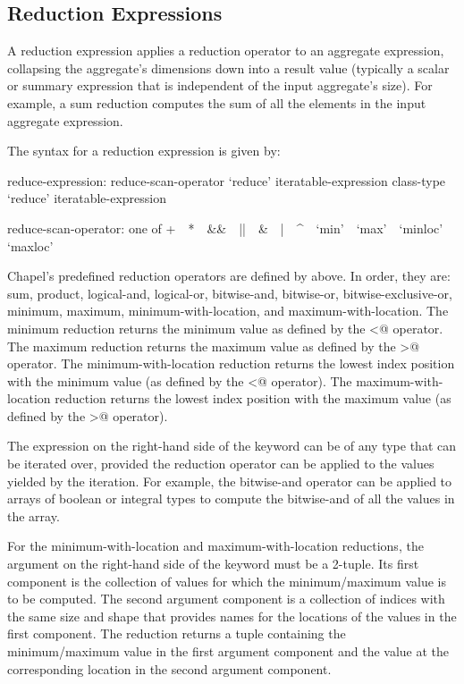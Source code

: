 \subsection{Reduction Expressions}
\label{reduce}

A reduction expression applies a reduction operator to an aggregate
expression, collapsing the aggregate's dimensions down into a result
value (typically a scalar or summary expression that is independent of
the input aggregate's size).  For example, a sum reduction computes
the sum of all the elements in the input aggregate expression.

The syntax for a reduction expression is given by:
\begin{syntax}
reduce-expression:
  reduce-scan-operator `reduce' iteratable-expression
  class-type `reduce' iteratable-expression

reduce-scan-operator: one of
  + $ $ $ $ * $ $ $ $ && $ $ $ $ || $ $ $ $ & $ $ $ $ | $ $ $ $ ^ $ $ $ $ `min' $ $ $ $ `max' $ $ $ $ `minloc' $ $ $ $ `maxloc'
\end{syntax}

Chapel's predefined reduction operators are defined
by  above.  In order, they are: sum,
product, logical-and, logical-or, bitwise-and, bitwise-or,
bitwise-exclusive-or, minimum, maximum, minimum-with-location, and
maximum-with-location.  The minimum reduction returns the minimum
value as defined by the \verb@<@ operator.  The maximum reduction
returns the maximum value as defined by the \verb@>@ operator.  The
minimum-with-location reduction returns the lowest index position with
the minimum value (as defined by the \verb@<@ operator).  The
maximum-with-location reduction returns the lowest index position with
the maximum value (as defined by the \verb@>@ operator).

The expression on the right-hand side of the  keyword
can be of any type that can be iterated over, provided
the reduction operator can be applied to the values yielded
by the iteration. For example, the bitwise-and
operator can be applied to arrays of boolean or integral types to
compute the bitwise-and of all the values in the array.

For the minimum-with-location and maximum-with-location reductions,
the argument on the right-hand side of the  keyword
must be a 2-tuple. Its first component is the collection
of values for which the minimum/maximum value is to be computed.  The
second argument component is a collection of indices with the same size and
shape that provides names for the locations of the values in the first
component.  The reduction returns a tuple containing the
minimum/maximum value in the first argument component and the value
at the corresponding location in the second argument component.

